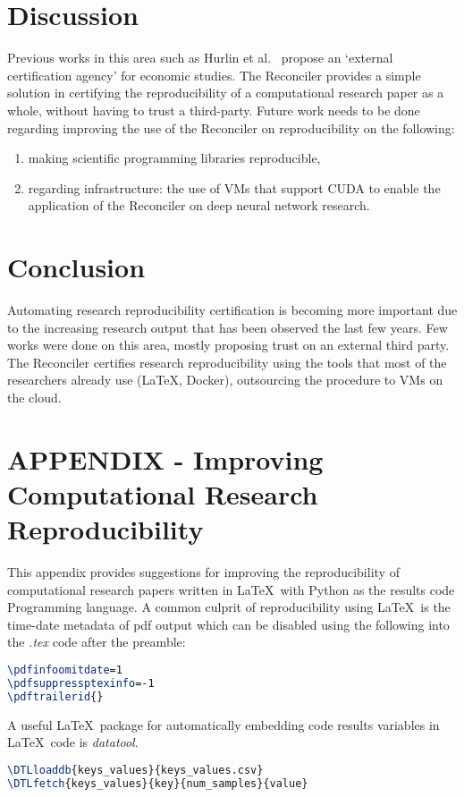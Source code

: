 \documentclass[journal]{IEEEtran}
\begin{document}
\section{Discussion}
Previous works in this area such as Hurlin et al.~\cite{hurlin2019reproducibility} propose an `external certification agency' for economic studies.
The Reconciler provides a simple solution in certifying the reproducibility of a computational research paper as a whole, without having to trust a third-party.
Future work needs to be done regarding improving the use of the Reconciler on reproducibility on the following:
\begin{enumerate}
	\item making scientific programming libraries reproducible,
	\item regarding infrastructure: the use of VMs that support CUDA to enable the application of the Reconciler on deep neural network research.
\end{enumerate}

\section{Conclusion}
Automating research reproducibility certification is becoming more important due to the increasing research output that has been observed the last few years.
Few works were done on this area, mostly proposing trust on an external third party.
The Reconciler certifies research reproducibility using the tools that most of the researchers already use (\LaTeX, Docker), outsourcing the procedure to VMs on the cloud.

\section{APPENDIX - Improving Computational Research Reproducibility}
This appendix provides suggestions for improving the reproducibility of computational research papers written in \LaTeX\ with Python as the results code Programming language.
A common culprit of reproducibility using \LaTeX\ is the time-date metadata of pdf output which can be disabled using the following into the \textit{.tex} code after the preamble:
\begin{lstlisting}[language=TeX, style=lststyle, caption={\LaTeX\ pdf reproducibility commands for preamble.}, captionpos=b]
\pdfinfoomitdate=1
\pdfsuppressptexinfo=-1
\pdftrailerid{}
\end{lstlisting}

A useful \LaTeX\ package for automatically embedding code results variables in \LaTeX\ code is \textit{datatool}.
\begin{lstlisting}[language=TeX, style=lststyle, caption={\LaTeX\ datatool example of loading a file that contains pairs of keys and values (keys\_values.csv) generated by a results code and getting the value of a key named num\_samples.}, captionpos=b]
\DTLloaddb{keys_values}{keys_values.csv}
\DTLfetch{keys_values}{key}{num_samples}{value}
\end{lstlisting}
\end{document}
